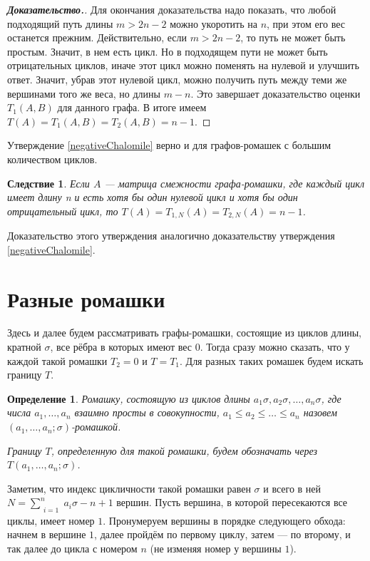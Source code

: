 \documentclass[12pt]{article}
\newtheorem{definition}[theorem]{Определение}
\newtheorem{corollary}[theorem]{Следствие}
\begin{document}
\begin{proof}[\textbf{Доказательство.}]
Для окончания доказательства надо показать, что любой подходящий путь длины $m > 2n - 2$ можно укоротить на $n$, при этом его вес останется прежним. Действительно, если $m > 2n - 2$, то путь не может быть простым. Значит, в нем есть цикл. Но в подходящем пути не может быть отрицательных циклов, иначе этот цикл можно поменять на нулевой и улучшить ответ. Значит, убрав этот нулевой цикл, можно получить путь между теми же вершинами того же веса, но длины $m - n$. Это завершает доказательство оценки $T_1(A, B)$ для данного графа.
В итоге имеем $T(A) = T_1(A, B) = T_2(A, B) = n - 1$.
\end{proof}

Утверждение \ref{negativeChalomile} верно и для графов-ромашек с большим количеством циклов.
\begin{corollary}
Если $A$ --- матрица смежности графа-ромашки, где каждый цикл имеет длину n и есть хотя бы один нулевой цикл и хотя бы один отрицательный цикл, то $T(A) = T_{1, N}(A) = T_{2, N}(A) = n - 1$.
\end{corollary}

Доказательство этого утверждения аналогично доказательству утверждения \ref{negativeChalomile}.

\section{Разные ромашки}
Здесь и далее будем рассматривать графы-ромашки, состоящие из циклов длины, кратной $\sigma$, все рёбра в которых имеют вес $0$. Тогда сразу можно сказать, что у каждой такой ромашки $T_2 = 0$ и $T = T_1$. Для разных таких ромашек будем искать границу $T$.
\begin{definition}
Ромашку, состоящую из циклов длины $a_1\sigma, a_2\sigma, \dots, a_n\sigma$, где числа $a_1, \dots, a_n$ взаимно просты в совокупности, $a_1\le a_2 \le \dots \le a_n$ назовем $(a_1, \dots, a_n; \sigma)$-ромашкой.

Границу $T$, определенную для такой ромашки, будем обозначать через $T(a_1, \dots, a_n; \sigma)$.
\end{definition}

Заметим, что индекс цикличности такой ромашки равен $\sigma$ и всего в ней $N = \sum\limits_{\substack{i=1}}^n a_i\sigma - n + 1$ вершин. Пусть вершина, в которой пересекаются все циклы, имеет номер $1$. Пронумеруем вершины в порядке следующего обхода: начнем в вершине $1$, далее пройдём по первому циклу, затем --- по второму, и так далее до цикла с номером $n$ (не изменяя номер у вершины $1$).
\end{document}
